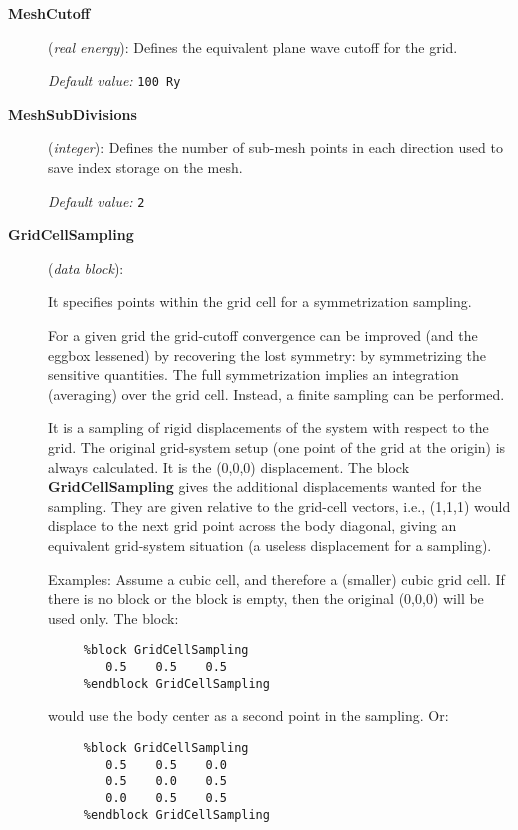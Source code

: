 \documentclass[11pt]{article}
\begin{document}
\begin{description}

\item[{\bf MeshCutoff}] ({\it real energy}): 
Defines the equivalent plane wave cutoff for the grid.

{\it Default value:} {\tt 100 Ry}

\item[{\bf MeshSubDivisions}] ({\it integer}): 
Defines the number of sub-mesh points in each direction used
to save index storage on the mesh. 

{\it Default value:} {\tt 2}

\item[{\bf GridCellSampling}] ({\it data block}): 

It specifies points within the grid cell for a symmetrization sampling.

For a given grid the grid-cutoff convergence can be improved (and the
eggbox lessened) by recovering the lost symmetry: by symmetrizing the
sensitive quantities. The full symmetrization implies an integration
(averaging) over the grid cell. Instead, a finite sampling can be
performed.

It is a sampling of rigid displacements of the system with respect
to the grid. The original grid-system setup (one point of the grid
at the origin) is always calculated. It is the (0,0,0) displacement. 
The block {\bf GridCellSampling} gives the additional displacements
wanted for the sampling. They are given relative to the grid-cell 
vectors, i.e., (1,1,1) would displace to the next grid point across
the body diagonal, giving an equivalent grid-system situation
(a useless displacement for a sampling).

Examples: Assume a cubic cell, and therefore a (smaller) cubic grid cell.
If there is no block or the block is empty, then the original (0,0,0)
will be used only. The block: 

\begin{verbatim}
     %block GridCellSampling
        0.5    0.5    0.5
     %endblock GridCellSampling
\end{verbatim}

would use the body center as a second point in the sampling. Or:


\begin{verbatim}
     %block GridCellSampling
        0.5    0.5    0.0
        0.5    0.0    0.5
        0.0    0.5    0.5
     %endblock GridCellSampling
\end{verbatim}


\end{description}
\end{document}
